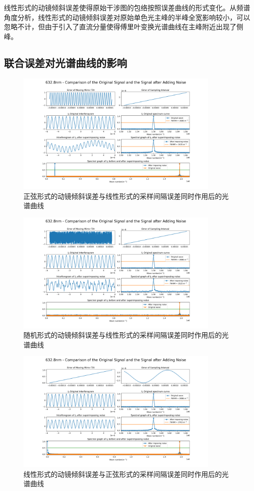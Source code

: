 \documentclass[conference]{IEEEtran}
\begin{document}
线性形式的动镜倾斜误差使得原始干涉图的包络按照误差曲线的形式变化。从频谱角度分析，线性形式的动镜倾斜误差对原始单色光主峰的半峰全宽影响较小，可以忽略不计，但由于引入了直流分量使得傅里叶变换光谱曲线在主峰附近出现了侧峰。

\subsection{联合误差对光谱曲线的影响}
\begin{figure}[htbp]
	\centerline{
		\includegraphics[width=10cm]{4.png} 	
	}
	\caption{正弦形式的动镜倾斜误差与线性形式的采样间隔误差同时作用后的光谱曲线}
	\label{pic4}
\end{figure}

\begin{figure}[htbp]
	\centerline{
		\includegraphics[width=10cm]{5.png} 	
	}
	\caption{随机形式的动镜倾斜误差与线性形式的采样间隔误差同时作用后的光谱曲线}
	\label{pic5}
\end{figure}

\begin{figure}[htbp]
	\centerline{
		\includegraphics[width=10cm]{6.png} 	
	}
	\caption{线性形式的动镜倾斜误差与正弦形式的采样间隔误差同时作用后的光谱曲线}
	\label{pic6}
\end{figure}
\end{document}
